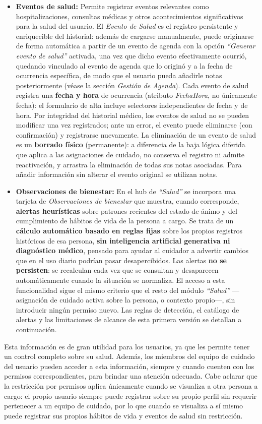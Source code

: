 \documentclass[a4paper,12pt]{article}
\begin{document}
\begin{itemize}
        \item \textbf{Eventos de salud:} Permite registrar eventos relevantes como hospitalizaciones, consultas médicas y otros acontecimientos significativos para la salud del usuario. El \textit{Evento de Salud} es el registro persistente y enriquecible del historial: además de cargarse manualmente, puede originarse de forma automática a partir de un evento de agenda con la opción \textit{“Generar evento de salud”} activada, una vez que dicho evento efectivamente ocurrió, quedando vinculado al evento de agenda que lo originó y a la fecha de ocurrencia específica, de modo que el usuario pueda añadirle notas posteriormente (véase la sección \textit{Gestión de Agenda}). Cada evento de salud registra una \textbf{fecha y hora} de ocurrencia (atributo \textit{FechaHora}, no únicamente fecha): el formulario de alta incluye selectores independientes de fecha y de hora. Por integridad del historial médico, los eventos de salud no se pueden modificar una vez registrados; ante un error, el evento puede eliminarse (con confirmación) y registrarse nuevamente. La eliminación de un evento de salud es un \textbf{borrado físico} (permanente): a diferencia de la baja lógica diferida que aplica a las asignaciones de cuidado, no conserva el registro ni admite reactivación, y arrastra la eliminación de todas sus notas asociadas. Para añadir información sin alterar el evento original se utilizan notas.
        \item \textbf{Observaciones de bienestar:} En el hub de \textit{``Salud''} se incorpora una tarjeta de \textit{Observaciones de bienestar} que muestra, cuando corresponde, \textbf{alertas heurísticas} sobre patrones recientes del estado de ánimo y del cumplimiento de hábitos de vida de la persona a cargo. Se trata de un \textbf{cálculo automático basado en reglas fijas} sobre los propios registros históricos de esa persona, \textbf{sin inteligencia artificial generativa ni diagnóstico médico}, pensado para ayudar al cuidador a advertir cambios que en el uso diario podrían pasar desapercibidos. Las alertas \textbf{no se persisten}: se recalculan cada vez que se consultan y desaparecen automáticamente cuando la situación se normaliza. El acceso a esta funcionalidad sigue el mismo criterio que el resto del módulo \textit{``Salud''} —asignación de cuidado activa sobre la persona, o contexto propio—, sin introducir ningún permiso nuevo. Las reglas de detección, el catálogo de alertas y las limitaciones de alcance de esta primera versión se detallan a continuación.
    \end{itemize}
    \par Esta información es de gran utilidad para los usuarios, ya que les permite tener un control completo sobre su salud. Además, los miembros del equipo de cuidado del usuario pueden acceder a esta información, siempre y cuando cuenten con los permisos correspondientes, para brindar una atención adecuada. Cabe aclarar que la restricción por permisos aplica únicamente cuando se visualiza a otra persona a cargo: el propio usuario siempre puede registrar sobre su propio perfil sin requerir pertenecer a un equipo de cuidado, por lo que cuando se visualiza a sí mismo puede registrar sus propios hábitos de vida y eventos de salud sin restricción.
\end{document}
